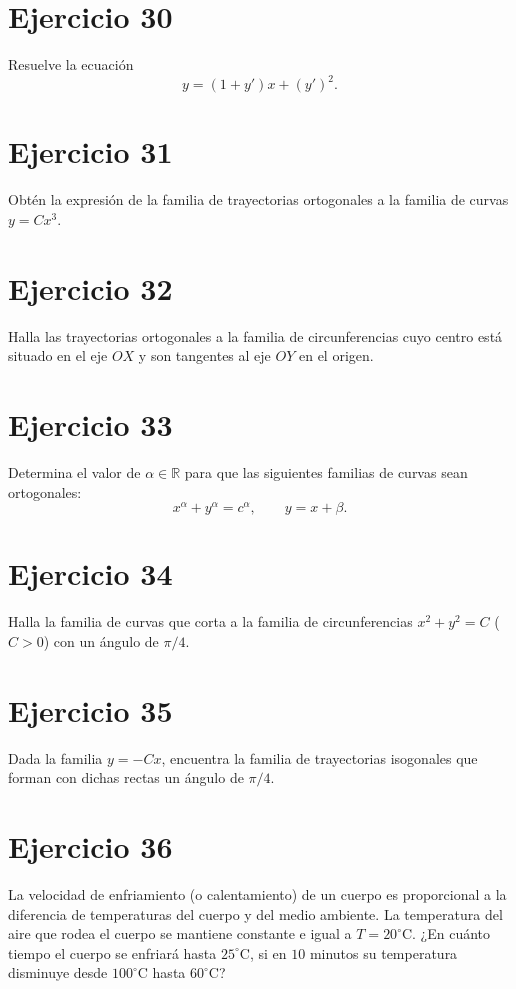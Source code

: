 \documentclass[12pt]{article}
\begin{document}
\section*{Ejercicio 30}
Resuelve la ecuación
\[
y = (1 + y')x + (y')^2.
\]

\section*{Ejercicio 31}
Obtén la expresión de la familia de trayectorias ortogonales a la familia de curvas $y = Cx^3$.

\section*{Ejercicio 32}
Halla las trayectorias ortogonales a la familia de circunferencias cuyo centro está situado en el eje $OX$ y son tangentes al eje $OY$ en el origen.

\section*{Ejercicio 33}
Determina el valor de $\alpha \in \mathbb{R}$ para que las siguientes familias de curvas sean ortogonales:
\[
x^\alpha + y^\alpha = c^\alpha, 
\qquad
y = x + \beta.
\]

\section*{Ejercicio 34}
Halla la familia de curvas que corta a la familia de circunferencias $x^2 + y^2 = C$ ($C > 0$) con un ángulo de $\pi/4$.

\section*{Ejercicio 35}
Dada la familia $y = -Cx$, encuentra la familia de trayectorias isogonales que forman con dichas rectas un ángulo de $\pi/4$.

\section*{Ejercicio 36}
La velocidad de enfriamiento (o calentamiento) de un cuerpo es proporcional a la diferencia de temperaturas del cuerpo y del medio ambiente. La temperatura del aire que rodea el cuerpo se mantiene constante e igual a $T = 20^\circ\mathrm{C}$. ¿En cuánto tiempo el cuerpo se enfriará hasta $25^\circ\mathrm{C}$, si en $10$ minutos su temperatura disminuye desde $100^\circ\mathrm{C}$ hasta $60^\circ\mathrm{C}$?
\end{document}

